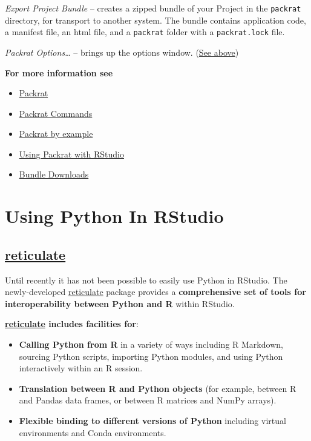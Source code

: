 \documentclass[]{book}
\providecommand{\tightlist}{%
  \setlength{\itemsep}{0pt}\setlength{\parskip}{0pt}}
\theoremstyle{definition}
\theoremstyle{definition}
\theoremstyle{definition}
\theoremstyle{remark}
\begin{document}
\emph{Export Project Bundle} -- creates a zipped bundle of your Project
in the \texttt{packrat} directory, for transport to another system. The
bundle contains application code, a manifest file, an html file, and a
\texttt{packrat} folder with a \texttt{packrat.lock} file.

\emph{Packrat Options\ldots{}} -- brings up the options window.
(\protect\hyperlink{packrat_options}{See above})

\textbf{For more information see}

\begin{itemize}
\tightlist
\item
  \href{https://rstudio.github.io/packrat/}{Packrat}
\item
  \href{https://rstudio.github.io/packrat/commands.html}{Packrat
  Commands}
\item
  \href{https://rstudio.github.io/packrat/walkthrough.html}{Packrat by
  example}
\item
  \href{https://rstudio.github.io/packrat/rstudio.html}{Using Packrat
  with RStudio}
\item
  \href{https://support.rstudio.com/hc/en-us/articles/115003639788-Bundle-Downloads}{Bundle
  Downloads}
\end{itemize}

\hypertarget{using-python-in-rstudio}{%
\section{Using Python In RStudio}\label{using-python-in-rstudio}}

\hypertarget{reticulate}{%
\subsection{\texorpdfstring{
\href{https://rstudio.github.io/reticulate/index.html}{reticulate}}{ reticulate}}\label{reticulate}}

Until recently it has not been possible to easily use Python in RStudio.
The newly-developed
\href{https://rstudio.github.io/reticulate/index.html}{reticulate}
package provides a \textbf{comprehensive set of tools for
interoperability between Python and R} within RStudio.

\textbf{\href{https://rstudio.github.io/reticulate/index.html}{reticulate}
includes facilities for}:

\begin{itemize}
\item
  \textbf{Calling Python from R} in a variety of ways including R
  Markdown, sourcing Python scripts, importing Python modules, and using
  Python interactively within an R session.
\item
  \textbf{Translation between R and Python objects} (for example,
  between R and Pandas data frames, or between R matrices and NumPy
  arrays).
\item
  \textbf{Flexible binding to different versions of Python} including
  virtual environments and Conda environments.
\end{itemize}
\end{document}
